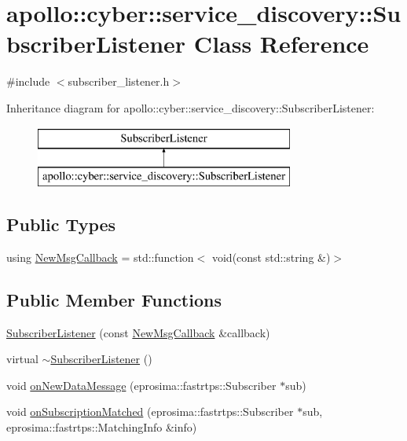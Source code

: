\hypertarget{classapollo_1_1cyber_1_1service__discovery_1_1SubscriberListener}{\section{apollo\-:\-:cyber\-:\-:service\-\_\-discovery\-:\-:Subscriber\-Listener Class Reference}
\label{classapollo_1_1cyber_1_1service__discovery_1_1SubscriberListener}
}


{\ttfamily \#include $<$subscriber\-\_\-listener.\-h$>$}

Inheritance diagram for apollo\-:\-:cyber\-:\-:service\-\_\-discovery\-:\-:Subscriber\-Listener\-:\begin{figure}[H]
\begin{center}
\leavevmode
\includegraphics[height=2.000000cm]{classapollo_1_1cyber_1_1service__discovery_1_1SubscriberListener}
\end{center}
\end{figure}
\subsection*{Public Types}
\begin{DoxyCompactItemize}
\item 
using \hyperlink{classapollo_1_1cyber_1_1service__discovery_1_1SubscriberListener_a3fa5bb4a829d0f92f13bfa2d7ef0fb57}{New\-Msg\-Callback} = std\-::function$<$ void(const std\-::string \&)$>$
\end{DoxyCompactItemize}
\subsection*{Public Member Functions}
\begin{DoxyCompactItemize}
\item 
\hyperlink{classapollo_1_1cyber_1_1service__discovery_1_1SubscriberListener_abed2ec0a94528bab1d77c69e0274b7be}{Subscriber\-Listener} (const \hyperlink{classapollo_1_1cyber_1_1service__discovery_1_1SubscriberListener_a3fa5bb4a829d0f92f13bfa2d7ef0fb57}{New\-Msg\-Callback} \&callback)
\item 
virtual \hyperlink{classapollo_1_1cyber_1_1service__discovery_1_1SubscriberListener_ad76445c5fb05f28cd10d0dd30ebc0315}{$\sim$\-Subscriber\-Listener} ()
\item 
void \hyperlink{classapollo_1_1cyber_1_1service__discovery_1_1SubscriberListener_ab64f1c839c1843806d183ec0dda699a7}{on\-New\-Data\-Message} (eprosima\-::fastrtps\-::\-Subscriber $\ast$sub)
\item 
void \hyperlink{classapollo_1_1cyber_1_1service__discovery_1_1SubscriberListener_ad6bca107aad56c9b52e529d4427384f1}{on\-Subscription\-Matched} (eprosima\-::fastrtps\-::\-Subscriber $\ast$sub, eprosima\-::fastrtps\-::\-Matching\-Info \&info)
\end{DoxyCompactItemize}
